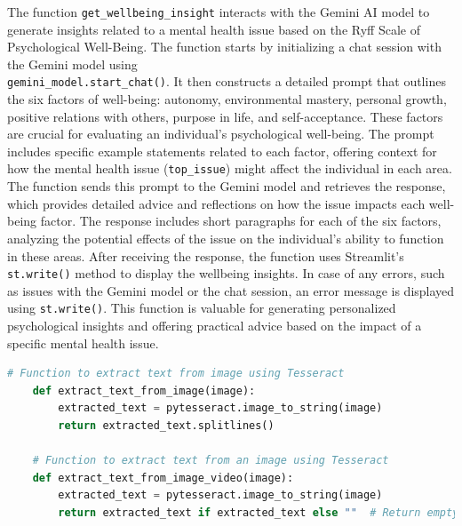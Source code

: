 \noindent
The function \texttt{get\_wellbeing\_insight} interacts with the Gemini AI model to generate insights related to a mental health issue based on the Ryff Scale of Psychological Well-Being. The function starts by initializing a chat session with the Gemini model using \\
\texttt{gemini\_model.start\_chat()}. It then constructs a detailed prompt that outlines the six factors of well-being: autonomy, environmental mastery, personal growth, positive relations with others, purpose in life, and self-acceptance. These factors are crucial for evaluating an individual's psychological well-being. The prompt includes specific example statements related to each factor, offering context for how the mental health issue (\texttt{top\_issue}) might affect the individual in each area. The function sends this prompt to the Gemini model and retrieves the response, which provides detailed advice and reflections on how the issue impacts each well-being factor. The response includes short paragraphs for each of the six factors, analyzing the potential effects of the issue on the individual's ability to function in these areas. After receiving the response, the function uses Streamlit's \texttt{st.write()} method to display the wellbeing insights. In case of any errors, such as issues with the Gemini model or the chat session, an error message is displayed using \texttt{st.write()}. This function is valuable for generating personalized psychological insights and offering practical advice based on the impact of a specific mental health issue.


\begin{tcolorbox}[colback=gray!5!white, colframe=gray!80!black, boxrule=0.5pt, title=Extract Text from Image Using Tesseract]
    \begin{lstlisting}[language=Python]
    # Function to extract text from image using Tesseract
    def extract_text_from_image(image):
        extracted_text = pytesseract.image_to_string(image)
        return extracted_text.splitlines()

    # Function to extract text from an image using Tesseract
    def extract_text_from_image_video(image):
        extracted_text = pytesseract.image_to_string(image)
        return extracted_text if extracted_text else ""  # Return empty string if no text is found
    \end{lstlisting}
\end{tcolorbox}

